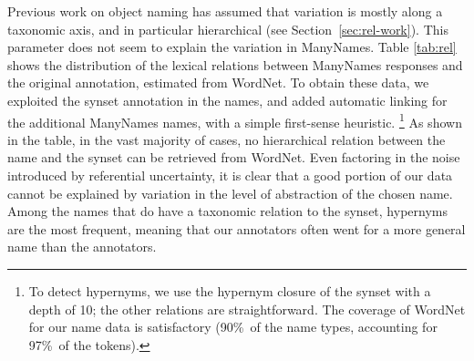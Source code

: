 Previous work on object naming has assumed that variation is mostly along a taxonomic axis, and in particular hierarchical (see Section~\ref{sec:rel-work}).
This parameter does not seem to explain the variation in ManyNames. 
Table \ref{tab:rel} shows the distribution of the lexical relations between ManyNames responses and the original \vg annotation, estimated from WordNet.
To obtain these data, we exploited the synset annotation in the \vg names, and added automatic linking for the additional ManyNames names, with a simple first-sense heuristic.%
\footnote{To detect hypernyms, we use the hypernym closure of the synset with a depth of 10; the other relations are straightforward. The coverage of WordNet for our name data is satisfactory (90\%\ of the name types, accounting for 97\%\ of the tokens).}
As shown in the table, in the vast majority of cases, no hierarchical relation between the name and the synset can be retrieved from WordNet.
Even factoring in the noise introduced by referential uncertainty, it is clear that a good portion of our data cannot be explained by variation in the level of abstraction of the chosen name. 
Among the names that do have a taxonomic relation to the synset, hypernyms are the most frequent, meaning that our annotators often went for a more general name than the \vg annotators.
%

